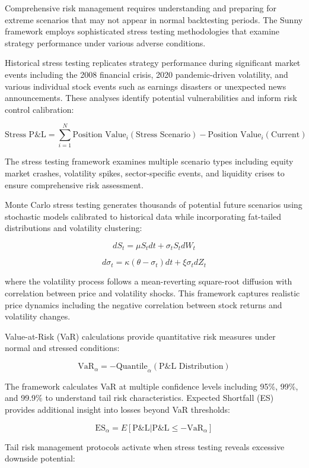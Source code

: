 \documentclass[
  american,
  11pt,
  11pt,
  letterpaper,
  onecolumn]{article}
\begin{document}
Comprehensive risk management requires understanding and preparing for
extreme scenarios that may not appear in normal backtesting periods. The
Sunny framework employs sophisticated stress testing methodologies that
examine strategy performance under various adverse conditions.

Historical stress testing replicates strategy performance during
significant market events including the 2008 financial crisis, 2020
pandemic-driven volatility, and various individual stock events such as
earnings disasters or unexpected news announcements. These analyses
identify potential vulnerabilities and inform risk control calibration:

\[\text{Stress P\&L} = \sum_{i=1}^{N} \text{Position Value}_i(\text{Stress Scenario}) - \text{Position Value}_i(\text{Current})\]

The stress testing framework examines multiple scenario types including
equity market crashes, volatility spikes, sector-specific events, and
liquidity crises to ensure comprehensive risk assessment.

Monte Carlo stress testing generates thousands of potential future
scenarios using stochastic models calibrated to historical data while
incorporating fat-tailed distributions and volatility clustering:

\[dS_t = \mu S_t dt + \sigma_t S_t dW_t\]

\[d\sigma_t = \kappa(\theta - \sigma_t)dt + \xi\sigma_t dZ_t\]

where the volatility process follows a mean-reverting square-root
diffusion with correlation between price and volatility shocks. This
framework captures realistic price dynamics including the negative
correlation between stock returns and volatility changes.

Value-at-Risk (VaR) calculations provide quantitative risk measures
under normal and stressed conditions:

\[\text{VaR}_{\alpha} = -\text{Quantile}_{\alpha}(\text{P\&L Distribution})\]

The framework calculates VaR at multiple confidence levels including
95\%, 99\%, and 99.9\% to understand tail risk characteristics. Expected
Shortfall (ES) provides additional insight into losses beyond VaR
thresholds:

\[\text{ES}_{\alpha} = E[\text{P\&L} | \text{P\&L} \leq -\text{VaR}_{\alpha}]\]

Tail risk management protocols activate when stress testing reveals
excessive downside potential:
\end{document}
